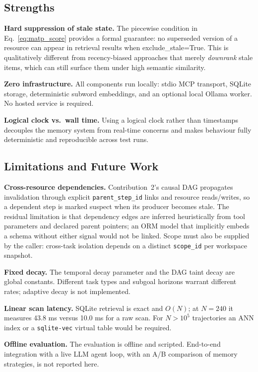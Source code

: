 \documentclass[lettersize,journal]{IEEEtran}
\begin{document}
\subsection{Strengths}

\textbf{Hard suppression of stale state.} The piecewise condition in Eq.~\eqref{eq:matp_score} provides a formal guarantee: no superseded version of a resource can appear in retrieval results when exclude\_stale=True. This is qualitatively different from recency-biased approaches that merely \emph{downrank} stale items, which can still surface them under high semantic similarity.

\textbf{Zero infrastructure.} All components run locally: stdio MCP transport, SQLite storage, deterministic subword embeddings, and an optional local Ollama worker. No hosted service is required.

\textbf{Logical clock vs.\ wall time.} Using a logical clock rather than timestamps decouples the memory system from real-time concerns and makes behaviour fully deterministic and reproducible across test runs.

\subsection{Limitations and Future Work}

\textbf{Cross-resource dependencies.} Contribution~2's causal DAG propagates invalidation through explicit \texttt{parent\_step\_id} links and resource reads/writes, so a dependent step is marked suspect when its producer becomes stale. The residual limitation is that dependency edges are inferred heuristically from tool parameters and declared parent pointers; an ORM model that implicitly embeds a schema without either signal would not be linked. Scope must also be supplied by the caller: cross-task isolation depends on a distinct \texttt{scope\_id} per workspace snapshot.

\textbf{Fixed decay.} The temporal decay parameter and the DAG taint decay are global constants. Different task types and subgoal horizons warrant different rates; adaptive decay is not implemented.

\textbf{Linear scan latency.} SQLite retrieval is exact and $O(N)$; at $N=240$ it measures 43.8 ms versus 10.0 ms for a raw scan. For $N > 10^5$ trajectories an ANN index or a \texttt{sqlite-vec} virtual table would be required.

\textbf{Offline evaluation.} The evaluation is offline and scripted. End-to-end integration with a live LLM agent loop, with an A/B comparison of memory strategies, is not reported here.
\end{document}
